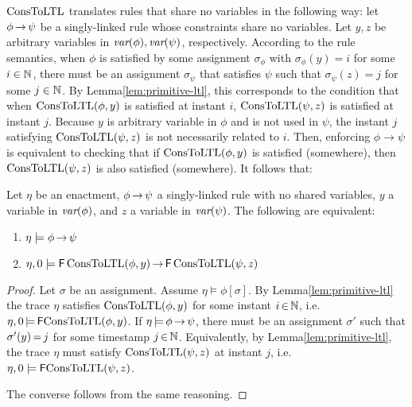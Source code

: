 $\text{ConsToLTL}$ translates rules
that share no variables in the following way:
let $\phi\,{\rightarrow}\,\psi$ be a
singly-linked rule whose constraints share no variables.
Let $y,z$ be arbitrary variables in $\textit{var}(\phi),\textit{var}(\psi)$, respectively.
According to the rule semantics,
when $\phi$ is satisfied by some assignment $\sigma_\phi$
with $\sigma_\phi(y)=i$ for some $i\in\mathbb{N}$,
there must be an assignment $\sigma_\psi$
that satisfies $\psi$
such that $\sigma_\psi(z)=j$ for some $j\in\mathbb{N}$.
By Lemma\:\ref{lem:primitive-ltl},
this corresponds to the condition that
when $\text{ConsToLTL}(\phi,y)$ is satisfied at instant $i$,
$\text{ConsToLTL}(\psi,z)$ is satisfied at instant $j$.
Because $y$ is arbitrary variable in $\phi$
and is not used in $\psi$,
the instant $j$
satisfying $\text{ConsToLTL}(\psi,z)$
is not necessarily related to $i$.
Then, enforcing $\phi\rightarrow\psi$
is equivalent to checking that
if $\text{ConsToLTL}(\phi,y)$ is satisfied (somewhere),
then $\text{ConsToLTL}(\psi,z)$ is also satisfied (somewhere).
It follows that:


\begin{lemma}\label{lem:rule-translation}
Let $\eta$ be an enactment,
$\phi\,{\to}\,\psi$ a singly-linked rule with no shared variables,
$y$ a variable in $\textit{var}(\phi)$, and
$z$ a variable in $\textit{var}(\psi)$.
The following are equivalent:
\begin{enumerate}
\item $\eta \models \phi\,{\rightarrow}\,\psi$
\item $\eta,0\models{\sf F}\,\text{ConsToLTL}(\phi,y)\,{\rightarrow}\,{\sf F}\,\text{ConsToLTL}(\psi,z)$
\end{enumerate}
\end{lemma}

\begin{proof}
Let $\sigma$ be an assignment.
Assume $\eta\models\phi[\sigma]$.
By Lemma\:\ref{lem:primitive-ltl}
the trace $\eta$ satisfies $\text{ConsToLTL}(\phi,y)$
for some instant $i\,{\in}\,\mathbb{N}$,
i.e. $\eta,0\,{\models}\,{\sf F}\text{ConsToLTL}(\phi,y)$.
If $\eta\,{\models}\,\phi\,{\rightarrow}\,\psi$,
there must be an assignment $\sigma'$ such that
$\sigma'(y)\,{=}\,j$ for some timestamp $j\,{\in}\,\mathbb{N}$.
Equivalently, by Lemma\:\ref{lem:primitive-ltl},
the trace $\eta$ must satisfy
$\text{ConsToLTL}(\psi,z)$ at instant $j$,
i.e. $\eta,0\models{\sf F}\text{ConsToLTL}(\psi,z)$.

The converse follows from the same reasoning.
\end{proof}

